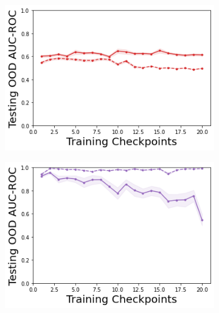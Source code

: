 \begin{figure}
    \begin{subfigure}{.2\textwidth}
        \includegraphics[width=\textwidth]{sections/011_icml2022/resources/DropOut-LunarLanderOOD-v0-AUC-ROC-epistemic_-testing-strategy.png}
    \end{subfigure}
    \begin{subfigure}{.2\textwidth}
        \includegraphics[width=\textwidth]{sections/011_icml2022/resources/Ensemble-LunarLanderOOD-v0-AUC-ROC-epistemic_-testing-strategy.png}
    \end{subfigure}
    \begin{subfigure}{.2\textwidth}

\end{subfigure}
\end{figure}
